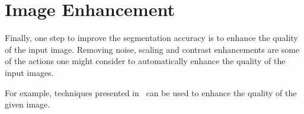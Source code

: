 
\section{Image Enhancement}\label{sec:image-enhancement}
Finally, one step to improve the segmentation accuracy is to enhance the
quality of the input image. Removing noise, scaling and contrast enhancements
are some of the actions one might consider to automatically enhance the quality
of the input images.

For example, techniques presented in~\cite{Huang-CVPR-2015} can be used to
enhance the quality of the given image.
